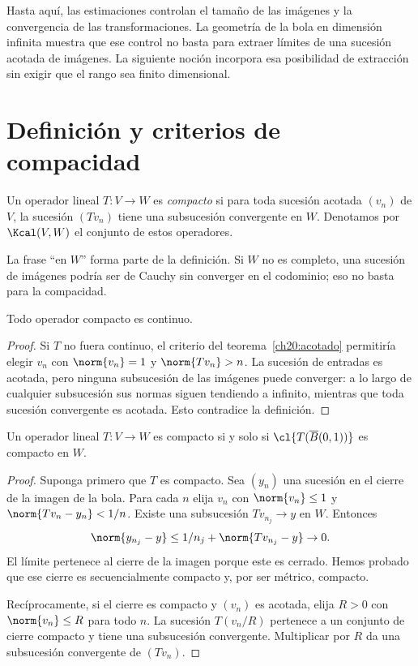 Hasta aquí, las estimaciones controlan el tamaño de las imágenes y la convergencia de las transformaciones. La geometría de la bola en dimensión infinita muestra que ese control no basta para extraer límites de una sucesión acotada de imágenes. La siguiente noción incorpora esa posibilidad de extracción sin exigir que el rango sea finito dimensional.

\section{Definición y criterios de compacidad}\label{lectura:23}

\begin{definicion}
Un operador lineal $T:V\to W$ es \emph{compacto} si para toda sucesión acotada $(v_n)$ de $V$, la sucesión $(Tv_n)$ tiene una subsucesión convergente en $W$. Denotamos por $\Kcal(V,W)$ el conjunto de estos operadores.
\end{definicion}

La frase ``en $W$'' forma parte de la definición. Si $W$ no es completo, una sucesión de imágenes podría ser de Cauchy sin converger en el codominio; eso no basta para la compacidad.

\begin{proposicion}\label{ch23:compacto-acotado}
Todo operador compacto es continuo.
\end{proposicion}
\begin{proof}
Si $T$ no fuera continuo, el criterio del teorema~\ref{ch20:acotado} permitiría elegir $v_n$ con $\norm{v_n}=1$ y $\norm{Tv_n}>n$. La sucesión de entradas es acotada, pero ninguna subsucesión de las imágenes puede converger: a lo largo de cualquier subsucesión sus normas siguen tendiendo a infinito, mientras que toda sucesión convergente es acotada. Esto contradice la definición.
\end{proof}

\begin{proposicion}\label{ch23:bola-compacta}
Un operador lineal $T:V\to W$ es compacto si y solo si $\cl{T(\overline B(0,1))}$ es compacto en $W$.
\end{proposicion}
\begin{proof}
Suponga primero que $T$ es compacto. Sea $(y_n)$ una sucesión en el cierre de la imagen de la bola. Para cada $n$ elija $v_n$ con $\norm{v_n}\leq1$ y $\norm{Tv_n-y_n}<1/n$. Existe una subsucesión $Tv_{n_j}\to y$ en $W$. Entonces
\[
 \norm{y_{n_j}-y}\leq1/n_j+\norm{Tv_{n_j}-y}\to0.
\]
El límite pertenece al cierre de la imagen porque este es cerrado. Hemos probado que ese cierre es secuencialmente compacto y, por ser métrico, compacto.

Recíprocamente, si el cierre es compacto y $(v_n)$ es acotada, elija $R>0$ con $\norm{v_n}\leq R$ para todo $n$. La sucesión $T(v_n/R)$ pertenece a un conjunto de cierre compacto y tiene una subsucesión convergente. Multiplicar por $R$ da una subsucesión convergente de $(Tv_n)$.
\end{proof}

